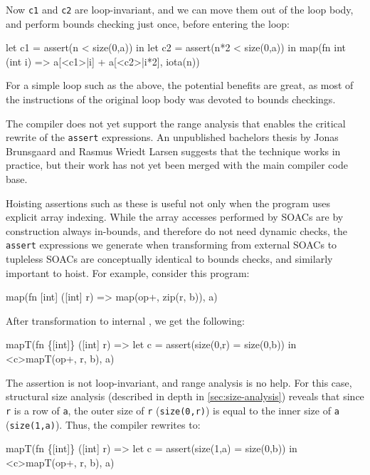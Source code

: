Now \texttt{c1} and \texttt{c2} are loop-invariant, and we can move
them out of the loop body, and perform bounds checking just once,
before entering the loop:

\begin{colorcode}
let c1 = assert(n   < size(0,a)) in
let c2 = assert(n*2 < size(0,a)) in
map(fn int (int i) =>
      a[<c1>|i] + a[<c2>|i*2],
    iota(n))
\end{colorcode}

For a simple loop such as the above, the potential benefits are great,
as most of the instructions of the original loop body was devoted to
bounds checkings.

The \LO{} compiler does not yet support the range analysis that
enables the critical rewrite of the \texttt{assert} expressions.  An
unpublished bachelors thesis by Jonas Brunsgaard and Rasmus Wriedt
Larsen suggests that the technique works in practice, but their work
has not yet been merged with the main compiler code base.

Hoisting assertions such as these is useful not only when the program
uses explicit array indexing.  While the array accesses performed by
SOACs are by construction always in-bounds, and therefore do not need
dynamic checks, the \texttt{assert} expressions we generate when
transforming from external SOACs to tupleless SOACs are conceptually
identical to bounds checks, and similarly important to hoist.  For
example, consider this program:

\begin{colorcode}
map(fn [int] ([int] r) =>
      map(op+, zip(r, b)),
    a)
\end{colorcode}

After transformation to internal \LO{}, we get the following:

\begin{colorcode}
mapT(fn \{[int]\} ([int] r) =>
       let c = assert(size(0,r) = size(0,b)) in
       <c>mapT(op+, r, b),
    a)
\end{colorcode}

The assertion is not loop-invariant, and range analysis is no help.
For this case, structural size analysis (described in depth in
\cref{sec:size-analysis}) reveals that since \texttt{r} is a row of
\texttt{a}, the outer size of \texttt{r} (\texttt{size(0,r)}) is equal
to the inner size of \texttt{a} (\texttt{size(1,a)}).  Thus, the
compiler rewrites to:

\begin{colorcode}
mapT(fn \{[int]\} ([int] r) =>
       let c = assert(size(1,a) = size(0,b)) in
       <c>mapT(op+, r, b),
    a)
\end{colorcode}

